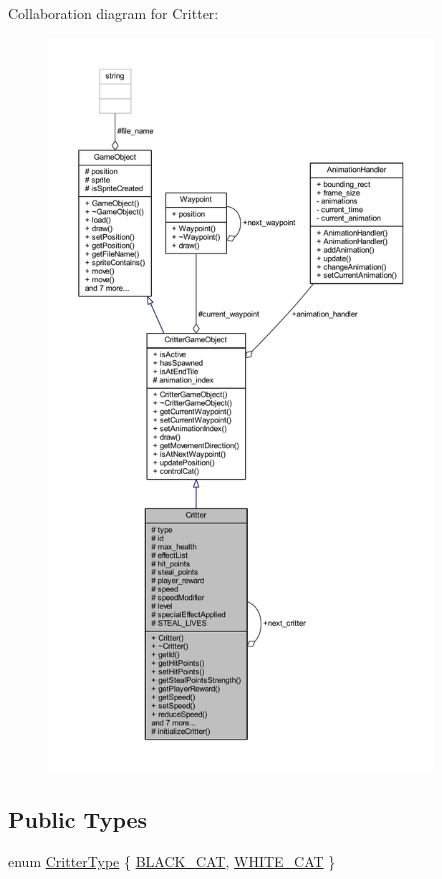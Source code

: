 Collaboration diagram for Critter\+:\nopagebreak
\begin{figure}[H]
\begin{center}
\leavevmode
\includegraphics[height=550pt]{class_critter__coll__graph}
\end{center}
\end{figure}
\subsection*{Public Types}
\begin{DoxyCompactItemize}
\item 
enum \hyperlink{class_critter_acda8a5c3234b66101e0546d75d6f90f1}{Critter\+Type} \{ \hyperlink{class_critter_acda8a5c3234b66101e0546d75d6f90f1a91135fa8da5b64a8a556e8c198b46fe9}{B\+L\+A\+C\+K\+\_\+\+C\+A\+T}, 
\hyperlink{class_critter_acda8a5c3234b66101e0546d75d6f90f1ac88c727edcec187617ee3707d2c193c5}{W\+H\+I\+T\+E\+\_\+\+C\+A\+T}
 \}
\end{DoxyCompactItemize}
